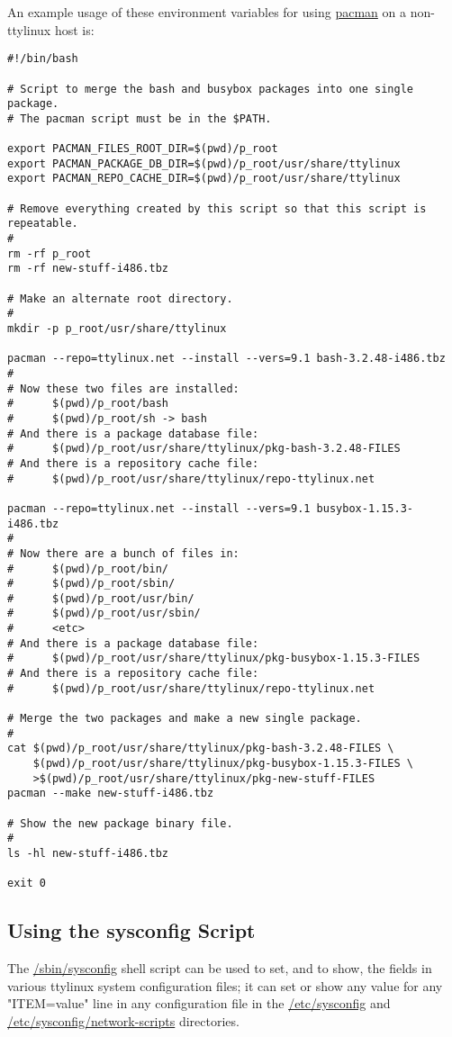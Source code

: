 \documentclass[10pt]{article}
\begin{document}
An example usage of these environment variables for using \url{pacman} on a
non-ttylinux host is:
\begin{lstlisting}
#!/bin/bash

# Script to merge the bash and busybox packages into one single package.
# The pacman script must be in the $PATH.

export PACMAN_FILES_ROOT_DIR=$(pwd)/p_root
export PACMAN_PACKAGE_DB_DIR=$(pwd)/p_root/usr/share/ttylinux
export PACMAN_REPO_CACHE_DIR=$(pwd)/p_root/usr/share/ttylinux

# Remove everything created by this script so that this script is repeatable.
#
rm -rf p_root
rm -rf new-stuff-i486.tbz

# Make an alternate root directory.
#
mkdir -p p_root/usr/share/ttylinux

pacman --repo=ttylinux.net --install --vers=9.1 bash-3.2.48-i486.tbz
#
# Now these two files are installed:
#      $(pwd)/p_root/bash
#      $(pwd)/p_root/sh -> bash
# And there is a package database file:
#      $(pwd)/p_root/usr/share/ttylinux/pkg-bash-3.2.48-FILES
# And there is a repository cache file:
#      $(pwd)/p_root/usr/share/ttylinux/repo-ttylinux.net

pacman --repo=ttylinux.net --install --vers=9.1 busybox-1.15.3-i486.tbz
#
# Now there are a bunch of files in:
#      $(pwd)/p_root/bin/
#      $(pwd)/p_root/sbin/
#      $(pwd)/p_root/usr/bin/
#      $(pwd)/p_root/usr/sbin/
#      <etc>
# And there is a package database file:
#      $(pwd)/p_root/usr/share/ttylinux/pkg-busybox-1.15.3-FILES
# And there is a repository cache file:
#      $(pwd)/p_root/usr/share/ttylinux/repo-ttylinux.net

# Merge the two packages and make a new single package.
#
cat $(pwd)/p_root/usr/share/ttylinux/pkg-bash-3.2.48-FILES \
    $(pwd)/p_root/usr/share/ttylinux/pkg-busybox-1.15.3-FILES \
    >$(pwd)/p_root/usr/share/ttylinux/pkg-new-stuff-FILES
pacman --make new-stuff-i486.tbz

# Show the new package binary file.
#
ls -hl new-stuff-i486.tbz

exit 0
\end{lstlisting}

\subsection{Using the sysconfig Script}
\label{sysconfig}

The \url{/sbin/sysconfig} shell script can be used to set, and to show, the
fields in various ttylinux system configuration files; it can set or show any
value for any "ITEM=value" line in any configuration file in the
\url{/etc/sysconfig} and \url{/etc/sysconfig/network-scripts} directories.
\end{document}

